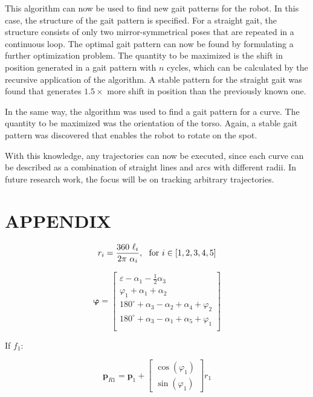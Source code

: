 \documentclass[letterpaper,10pt,conference]{ieeeconf}  %
\begin{document}
This algorithm can now be used to find new gait patterns for the robot.
In this case, the structure of the gait pattern is specified.
For a straight gait, the structure consists of only two mirror-symmetrical poses that are repeated in a continuous loop.
The optimal gait pattern can now be found by formulating a further optimization problem.
The quantity to be maximized is the shift in position generated in a gait pattern with $n$ cycles, which can be calculated by the recursive application of the algorithm.
A stable pattern for the straight gait was found that generates $1.5 \times$ more shift in position than the previously known one.

In the same way, the algorithm was used to find a gait pattern for a curve.
The quantity to be maximized was the orientation of the torso.
Again, a stable gait pattern was discovered that enables the robot to rotate on the spot.

With this knowledge, any trajectories can now be executed, since each curve can be described as a combination of straight lines and arcs with different radii.
In future research work, the focus will be on tracking arbitrary trajectories.



\section*{APPENDIX}

\begin{equation}
r_i = \frac{360 ~ \ell_i}{2 \pi ~ \alpha_i},~~ \textnormal{for}~ i \in [1,2,3,4,5]
\label{eq:F1_start}
\end{equation}

\begin{equation}
\bm{\varphi} = \begin{bmatrix}
\varepsilon - \alpha_1 - \frac{1}{2}\alpha_3 \\
\varphi_1 + \alpha_1 + \alpha_2 \\
180^\circ + \alpha_3 - \alpha_2 + \alpha_4 + \varphi_2 \\
180^\circ + \alpha_3 - \alpha_1 + \alpha_5 + \varphi_1 \\
\end{bmatrix}
\label{eq:phi_calc}
\end{equation}

If $f_1$:

\begin{equation}
\bm{p}_{R1} = \bm{p}_1 + 
\begin{bmatrix} 
\cos(\varphi_1)\\ 
\sin(\varphi_1)\end{bmatrix} r_1
\end{equation}
\end{document}
